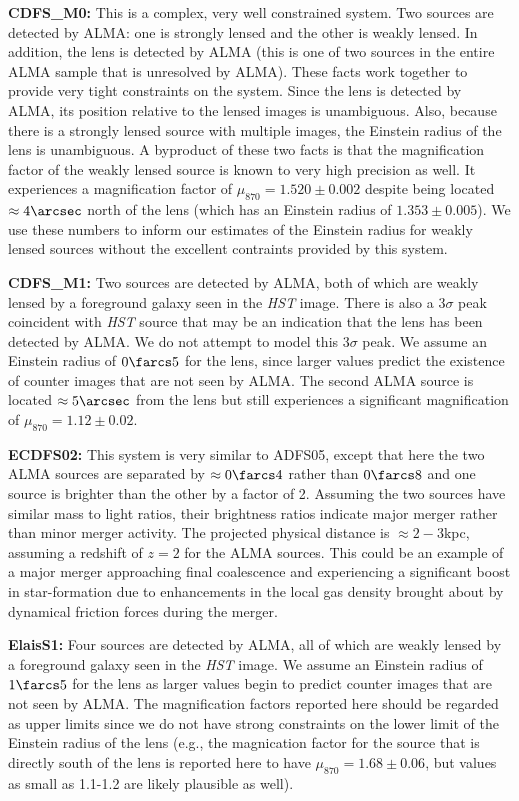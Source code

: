 \documentclass[iop]{emulateapj}
\begin{document}
{\bf CDFS\_M0:} This is a complex, very well constrained system.  Two sources
are detected by ALMA: one is strongly lensed and the other is weakly lensed.
In addition, the lens is detected by ALMA (this is one of two sources in the
entire ALMA sample that is unresolved by ALMA).  These facts work together to
provide very tight constraints on the system.  Since the lens is detected by
ALMA, its position relative to the lensed images is unambiguous.  Also, because
there is a strongly lensed source with multiple images, the Einstein radius of
the lens is unambiguous.  A byproduct of these two facts is that the
magnification factor of the weakly lensed source is known to very high
precision as well.  It experiences a magnification factor of $\mu_{870} =
1.520\pm0.002$ despite being located $\approx4\arcsec$ north of the lens (which
has an Einstein radius of $1.353\pm0.005$).  We use these numbers to inform our
estimates of the Einstein radius for weakly lensed sources without the
excellent contraints provided by this system.

{\bf CDFS\_M1:} Two sources are detected by ALMA, both of which are weakly
lensed by a foreground galaxy seen in the {\it HST} image.  There is also a
3$\sigma$ peak coincident with {\it HST} source that may be an indication that
the lens has been detected by ALMA.  We do not attempt to model this 3$\sigma$
peak.  We assume an Einstein radius of $0\farcs5$ for the lens, since larger
values predict the existence of counter images that are not seen by ALMA.  The
second ALMA source is located $\approx5\arcsec$ from the lens but still
experiences a significant magnification of $\mu_{870} = 1.12 \pm 0.02$.

{\bf ECDFS02:} This system is very similar to ADFS05, except that here the two
ALMA sources are separated by $\approx 0\farcs4$ rather than $0\farcs8$ and one
source is brighter than the other by a factor of 2.  Assuming the two sources
have similar mass to light ratios, their brightness ratios indicate major
merger rather than minor merger activity.  The projected physical distance is
$\approx 2-3$kpc, assuming a redshift of $z=2$ for the ALMA sources.  This
could be an example of a major merger approaching final coalescence and
experiencing a significant boost in star-formation due to enhancements in the
local gas density brought about by dynamical friction forces during the merger.

{\bf ElaisS1:} Four sources are detected by ALMA, all of which are weakly
lensed by a foreground galaxy seen in the {\it HST} image.  We assume an
Einstein radius of $1\farcs5$ for the lens as larger values begin to predict
counter images that are not seen by ALMA.  The magnification factors reported
here should be regarded as upper limits since we do not have strong constraints
on the lower limit of the Einstein radius of the lens (e.g., the magnication
factor for the source that is directly south of the lens is reported here to
have $\mu_{870} = 1.68 \pm 0.06$, but values as small as 1.1-1.2 are likely
plausible as well).
\end{document}
